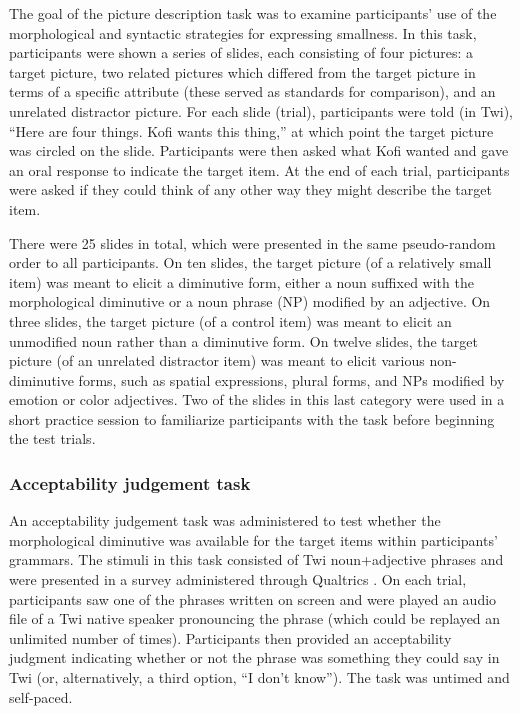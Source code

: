 \documentclass[output=paper,colorlinks,citecolor=brown]{langscibook}
\begin{document}
The goal of the picture description task was to examine participants' use of the morphological and syntactic strategies for expressing smallness. In this task, participants were shown a series of slides, each consisting of four pictures: a target picture, two related pictures which differed from the target picture in terms of a specific attribute (these served as standards for comparison), and an unrelated distractor picture. For each slide (trial), participants were told (in Twi), ``Here are four things. Kofi wants this thing,'' at which point the target picture was circled on the slide. Participants were then asked what Kofi wanted and gave an oral response to indicate the target item. At the end of each trial, participants were asked if they could think of any other way they might describe the target item.

There were 25 slides in total, which were presented in the same pseudo\hyp random order to all participants. On ten slides, the target picture (of a relatively small item) was meant to elicit a diminutive form, either a noun suffixed with the morphological diminutive or a noun phrase (NP) modified by an adjective. On three slides, the target picture (of a control item) was meant to elicit an unmodified noun rather than a diminutive form. On twelve slides, the target picture (of an unrelated distractor item) was meant to elicit various non-diminutive forms, such as spatial expressions, plural forms, and NPs modified by emotion or color adjectives. Two of the slides in this last category were used in a short practice session to familiarize participants with the task before beginning the test trials.

\subsubsection{Acceptability judgement task}
\label{AJTSec}

An acceptability judgement task was administered to test whether the morphological diminutive was available for the target items within participants' grammars. The stimuli in this task consisted of Twi noun+adjective phrases and were presented in a survey administered through Qualtrics \citep{Qualtrics}. On each trial, participants saw one of the phrases written on screen and were played an audio file of a Twi native speaker pronouncing the phrase (which could be replayed an unlimited number of times). Participants then provided an acceptability judgment indicating whether or not the phrase was something they could say in Twi (or, alternatively, a third option, “I don't know”). The task was untimed and self-paced.
\end{document}

